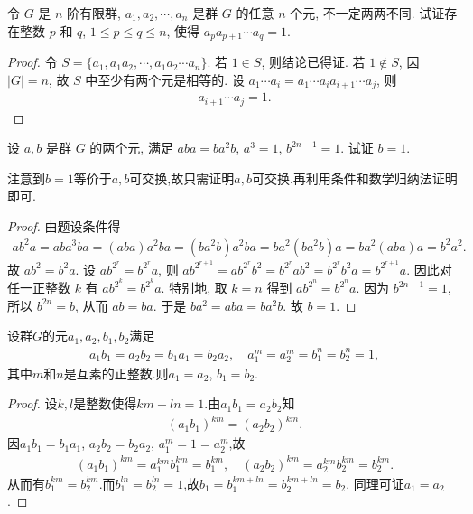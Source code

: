 \documentclass[../../main.tex]{subfiles}%
\begin{document}
\begin{example}
令 $G$ 是 $n$ 阶有限群, $a_1,a_2,\cdots,a_n$ 是群 $G$ 的任意 $n$ 个元, 不一定两两不同. 试证存在整数 $p$ 和 $q$, $1 \leqslant p \leqslant q \leqslant n$, 使得 $a_pa_{p+1}\cdots a_q = 1$.
\end{example}
\begin{proof}
令 $S = \{a_1,a_1a_2,\cdots,a_1a_2\cdots a_n\}$. 若 $1 \in S$, 则结论已得证. 若 $1 \notin S$, 因 $|G|=n$, 故 $S$ 中至少有两个元是相等的. 设 $a_1\cdots a_i = a_1\cdots a_i a_{i+1}\cdots a_j$, 则
\begin{align*}
a_{i+1}\cdots a_j = 1.
\end{align*}
\end{proof}

\begin{example}
设 $a,b$ 是群 $G$ 的两个元, 满足 $aba = ba^2b$, $a^3 = 1$, $b^{2n-1} = 1$. 试证 $b = 1$.
\end{example}
\begin{note}
注意到$b=1$等价于$a,b$可交换,故只需证明$a,b$可交换.再利用条件和数学归纳法证明即可.
\end{note}
\begin{proof}
由题设条件得
\begin{align*}
ab^2a = aba^3ba = (aba)a^2ba = (ba^2b)a^2ba = ba^2(ba^2b)a = ba^2(aba)a = b^2a^2.
\end{align*}
故 $ab^2 = b^2a$. 设 $ab^{2^r} = b^{2^r}a$, 则 $ab^{2^{r+1}} = ab^{2^r}b^2 = b^{2^r}ab^2 = b^{2^r}b^2a = b^{2^{r+1}}a$. 因此对任一正整数 $k$ 有 $ab^{2^k} = b^{2^k}a$. 特别地, 取 $k = n$ 得到 $ab^{2^n} = b^{2^n}a$. 因为 $b^{2n-1} = 1$, 所以 $b^{2n} = b$, 从而 $ab = ba$. 于是 $ba^2 = aba = ba^2b$. 故 $b = 1$.
\end{proof}

\begin{example}
设群$G$的元$a_1,a_2,b_1,b_2$满足
\begin{align*}
a_1b_1 = a_2b_2 = b_1a_1 = b_2a_2,\quad a_1^m = a_2^m = b_1^n = b_2^n = 1,
\end{align*}
其中$m$和$n$是互素的正整数.则$a_1 = a_2$, $b_1 = b_2$.
\end{example}
\begin{proof}
设$k,l$是整数使得$km + ln = 1$.由$a_1b_1 = a_2b_2$知
\begin{align*}
(a_1b_1)^{km} = (a_2b_2)^{km}.
\end{align*}
因$a_1b_1 = b_1a_1$, $a_2b_2 = b_2a_2$, $a_1^m = 1 = a_2^m$,故
\begin{align*}
(a_1b_1)^{km} = a_1^{km}b_1^{km} = b_1^{km},\quad (a_2b_2)^{km} = a_2^{km}b_2^{km} = b_2^{km}.
\end{align*}
从而有$b_1^{km} = b_2^{km}$.而$b_1^{ln} = b_2^{ln} = 1$,故$b_1 = b_1^{km+ln} = b_2^{km+ln} = b_2$.
同理可证$a_1 = a_2$.
\end{proof}
\end{document}
